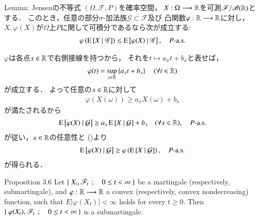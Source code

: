 	\begin{itembox}[l]{Lemma: Jensenの不等式}
		$(\Omega,\mathscr{F},P)$を確率空間，
		$X:\Omega \longrightarrow \mathbb{R}$を可測$\mathscr{F}/\mathscr{B}(\mathbb{R})$とする．
		このとき，任意の部分$\sigma$-加法族$\mathscr{G} \subset \mathscr{F}$及び
		凸関数$\varphi:\mathbb{R} \longrightarrow \mathbb{R}$に対し，
		$X,\varphi(X)$が$\Omega$上$P$に関して可積分であるなら次が成立する:
		\begin{align}
			\varphi\left(\operatorname{E} \left[ X \ \middle|\ \mathscr{G} \right] \right)
			\leq \operatorname{E} \left[ \varphi(X) \ \middle|\ \mathscr{G} \right],
			\quad \mbox{$P$-a.s.}
		\end{align}
	\end{itembox}
		\begin{prf}
			$\varphi$は各点$x \in \mathbb{R}$で右側接線を持つから，
			それを$t \longmapsto a_x t + b_x$と表せば，
			\begin{align}
				\varphi(t) = \operatorname*{sup}_{x \in \mathbb{R}} \left\{ a_x t + b_x \right\} \quad (\forall t \in \mathbb{R})
				\label{eq:prp_properties_of_expanded_conditional_expectation_1}
			\end{align}
			が成立する．
			よって任意の$x \in \mathbb{R}$に対して
			\begin{align}
				\varphi(X(\omega)) \geq a_x X(\omega) + b_x
			\end{align}
			が満たされるから
			\begin{align}
				\operatorname{E} \left[ \varphi(X) \ \middle|\ \mathcal{G} \right]
				\geq a_x \operatorname{E} \left[ X \ \middle|\ \mathcal{G} \right] + b_x \quad (\forall x \in \mathbb{R}),
				\quad \mbox{$P$-a.s.}
			\end{align}
			が従い，$x \in \mathbb{R}$の任意性と
			()より
			\begin{align}
				\operatorname{E} \left[ \varphi(X) \ \middle|\ \mathcal{G} \right] \geq \varphi\left( \operatorname{E} \left[ X \ \middle|\ \mathcal{G} \right] \right),
				\quad \mbox{$P$-a.s.}
			\end{align}
			が得られる．
			\QED
		\end{prf}
		
	\begin{itembox}[l]{Proposition 3.6}
		Let $\left\{\ X_t,\mathscr{F}_t\ \, ; \quad 0 \leq t < \infty\ \right\}$ be a martingale (respectively, 
		submartingale), and $\varphi:\mathbb{R} \longrightarrow \mathbb{R}$ a convex (respectively, convex 
		nondecreasing) function, such that $E\left|\varphi(X_t)\right| < \infty$ holds 
		for every $t \geq 0$. Then $\left\{\ \varphi(X_t),\mathscr{F}_t\ \, ; \quad 0 \leq t < \infty\ \right\}$ 
		is a submartingale.
	\end{itembox}
	

